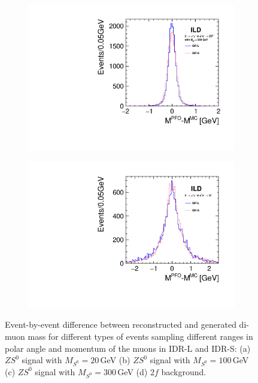 \begin{figure}[htbp]
\begin{subfigure}{0.475\hsize}
\includegraphics[width=\textwidth]{Performance/fig/lepton_pair_inm_difference_nh300.pdf}
 \caption{ \label{fig:extraH:Mdiff:mh300}}
 \end{subfigure}
\begin{subfigure}{0.475\hsize} 
\includegraphics[width=\textwidth]{Performance/fig/lepton_pair_inm_difference_2f.pdf}
 \caption{  \label{fig:extraH:Mdiff:2f}}
 \end{subfigure}
\caption{Event-by-event difference between reconstructed and generated di-muon mass for different types of events sampling different ranges in polar angle and momentum of the muons  in IDR-L and IDR-S:
(a) $ZS^0$ signal with $M_{S^0} = 20$\,GeV
(b) $ZS^0$ signal with $M_{S^0} = 100$\,GeV
(c) $ZS^0$ signal with $M_{S^0} = 300$\,GeV
(d) $2f$ background.
}
\label{fig:extraH:Mdiff}
\end{figure}

